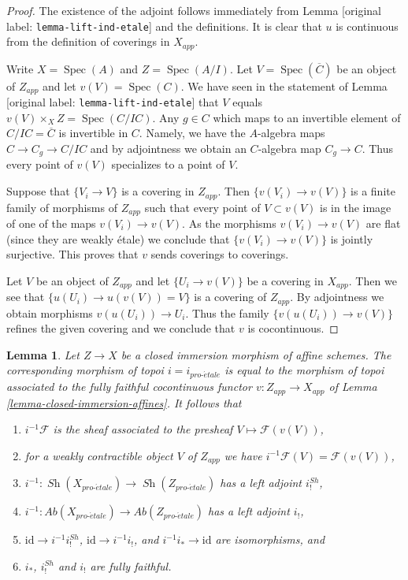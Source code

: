 \documentclass[10pt,a4paper]{article}
\theoremstyle{plain}
\newtheorem{lemma}[subsection]{Lemma}
\theoremstyle{definition}
\theoremstyle{remark}
\numberwithin{equation}{subsection}
\def\Spec{\mathop{\mathrm{Spec}}}
\def\Sh{\mathop{\mathit{Sh}}\nolimits}
\def\proetale{{pro\text{-}\acute{e}tale}}
\begin{document}
\begin{proof}
The existence of the adjoint follows immediately from
Lemma [original label: \nolinkurl{lemma-lift-ind-etale}] and the definitions.
It is clear that $u$ is continuous from the definition of
coverings in $X_{app}$.

\medskip\noindent
Write $X = \Spec(A)$ and $Z = \Spec(A/I)$. Let $V = \Spec(\overline{C})$
be an object of $Z_{app}$ and let $v(V) = \Spec(C)$.
We have seen in the statement of Lemma [original label: \nolinkurl{lemma-lift-ind-etale}]
that $V$ equals $v(V) \times_X Z = \Spec(C/IC)$.
Any $g \in C$ which maps to an invertible element of
$C/IC = \overline{C}$ is invertible in $C$. Namely, we have the
$A$-algebra maps $C \to C_g \to C/IC$ and by adjointness
we obtain an $C$-algebra map $C_g \to C$.
Thus every point of $v(V)$ specializes to a point of $V$.

\medskip\noindent
Suppose that $\{V_i \to V\}$ is a covering in $Z_{app}$.
Then $\{v(V_i) \to v(V)\}$ is a finite family of morphisms of
$Z_{app}$ such that every point of $V \subset v(V)$ is
in the image of one of the maps $v(V_i) \to v(V)$. As the
morphisms $v(V_i) \to v(V)$ are flat (since they are weakly \'etale)
we conclude that $\{v(V_i) \to v(V)\}$ is jointly surjective.
This proves that $v$ sends coverings to coverings.

\medskip\noindent
Let $V$ be an object of $Z_{app}$ and let $\{U_i \to v(V)\}$
be a covering in $X_{app}$. Then we see that
$\{u(U_i) \to u(v(V)) = V\}$ is a covering of $Z_{app}$.
By adjointness we obtain morphisms $v(u(U_i)) \to U_i$.
Thus the family $\{v(u(U_i)) \to v(V)\}$ refines the given
covering and we conclude that $v$ is cocontinuous.
\end{proof}

\begin{lemma}
\label{lemma-closed-immersion-affines-apply}
Let $Z \to X$ be a closed immersion morphism of affine schemes.
The corresponding morphism of topoi $i = i_\proetale$
is equal to the morphism of topoi
associated to the fully faithful cocontinuous functor
$v : Z_{app} \to X_{app}$ of Lemma \ref{lemma-closed-immersion-affines}.
It follows that
\begin{enumerate}
\item $i^{-1}\mathcal{F}$ is the sheaf associated to the presheaf
$V \mapsto \mathcal{F}(v(V))$,
\item for a weakly contractible object $V$ of $Z_{app}$ we have
$i^{-1}\mathcal{F}(V) = \mathcal{F}(v(V))$,
\item $i^{-1} : \Sh(X_\proetale) \to \Sh(Z_\proetale)$
has a left adjoint $i^{Sh}_!$,
\item $i^{-1} : \textit{Ab}(X_\proetale) \to \textit{Ab}(Z_\proetale)$
has a left adjoint $i_!$,
\item $\text{id} \to i^{-1}i^{Sh}_!$, $\text{id} \to i^{-1}i_!$, and
$i^{-1}i_* \to \text{id}$ are isomorphisms, and
\item $i_*$, $i^{Sh}_!$ and $i_!$ are fully faithful.
\end{enumerate}
\end{lemma}
\end{document}
